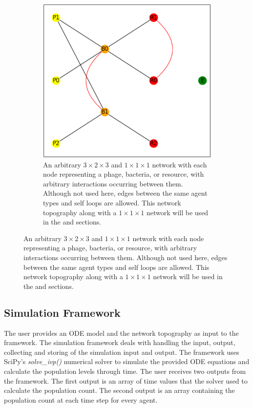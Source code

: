 \begin{figure}
\begin{subfigure}{0.49\linewidth}
        \includegraphics[width=\linewidth]{Screenshots/example_network.png}
        \caption{
            An arbitrary $3\times2\times3$ and $1\times 1 \times 1$ network with each node representing a phage, bacteria, or resource, with arbitrary interactions occurring between them. 
            Although not used here, edges between the same agent types and self loops are allowed. 
            This network topography along with a $1 \times 1 \times 1$ network will be used in the  and  sections. 
        }
        \label{fig:ss:example_network}
    \end{subfigure} 
 \end{figure}

\subsection{Simulation Framework}
\label{sec:simulation_framework}
The user provides an ODE model and the network topography as input to the framework. 
The simulation framework deals with handling the input, output, collecting and storing of the simulation input and output.
The framework uses SciPy's \cite{virtanenSciPy10Fundamental2020} \textit{solve\_ivp()} numerical solver \cite{ dormandFamilyEmbeddedRungeKutta1980} to simulate the provided ODE equations and calculate the population levels through time.
The user receives two outputs from the framework. 
The first output is an array of time values that the solver used to calculate the population count.
The second output is an array containing the population count at each time step for every agent.

